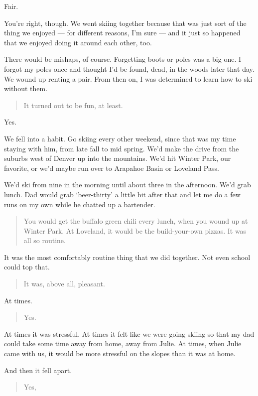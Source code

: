 Fair.

You're right, though. We went skiing together because that was just sort of the thing we enjoyed --- for different reasons, I'm sure --- and it just so happened that we enjoyed doing it around each other, too.

There would be mishaps, of course. Forgetting boots or poles was a big one. I forgot my poles once and thought I'd be found, dead, in the woods later that day. We wound up renting a pair. From then on, I was determined to learn how to ski without them.

\begin{quote}
It turned out to be fun, at least.
\end{quote}

Yes.

We fell into a habit. Go skiing every other weekend, since that was my time staying with him, from late fall to mid spring. We'd make the drive from the suburbs west of Denver up into the mountains. We'd hit Winter Park, our favorite, or we'd maybe run over to Arapahoe Basin or Loveland Pass.

We'd ski from nine in the morning until about three in the afternoon. We'd grab lunch. Dad would grab `beer-thirty' a little bit after that and let me do a few runs on my own while he chatted up a bartender.

\begin{quote}
You would get the buffalo green chili every lunch, when you wound up at Winter Park. At Loveland, it would be the build-your-own pizzas. It was all so routine.
\end{quote}

It was the most comfortably routine thing that we did together. Not even school could top that.

\begin{quote}
It was, above all, pleasant.
\end{quote}

At times.

\begin{quote}
Yes.
\end{quote}

At times it was stressful. At times it felt like we were going skiing so that my dad could take some time away from home, away from Julie. At times, when Julie came with us, it would be more stressful on the slopes than it was at home.

And then it fell apart.

\begin{quote}
Yes,
\end{quote}

